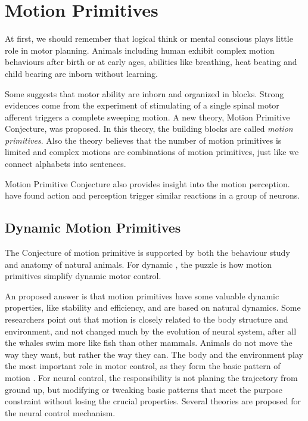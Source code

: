 \section{Motion Primitives}
At first, we should remember that logical think or mental conscious plays little role in motor planning.
Animals including human exhibit complex motion behaviours after birth or at early ages, abilities like breathing, heat beating and child bearing are inborn without learning.

Some suggests that motor ability are inborn and organized in blocks\citep{bizzi1995modular,bizzi2002book}.
Strong evidences come from the experiment of stimulating of a single spinal motor afferent triggers a complete sweeping motion\citep{bizzi1995modular}.
A new theory, Motion Primitive Conjecture, was proposed.
In this theory, the building blocks are called \emph{motion primitives}.
Also the theory believes that the number of motion primitives is limited and
complex motions are combinations of motion primitives, just like we connect alphabets into sentences.

Motion Primitive Conjecture also provides insight into the motion perception.
\citet{gallese1996action} have found action and perception trigger similar reactions in a group of neurons.





\subsection{Dynamic Motion Primitives}
The Conjecture of motion primitive is supported by both the behaviour study and anatomy of natural animals.
For dynamic \cms, the puzzle is how motion primitives simplify dynamic motor control.

An proposed answer is that motion primitives have some valuable dynamic properties, like stability and efficiency, and are based on natural dynamics.
Some researchers point out that motion is closely related to the body structure and environment,
and not changed much by the evolution of neural system, after all the whales swim more like fish than other mammals.
Animals do not move the way they want, but rather the way they can. 
The body and the environment play the most important role in motor control, as they form the basic pattern of motion \citep{nishikawa2007neuromechanics}.
For neural control, the responsibility is not planing the trajectory from ground up, but modifying or tweaking basic patterns that meet the purpose constraint without losing the crucial properties.
Several theories are proposed for the neural control mechanism.

